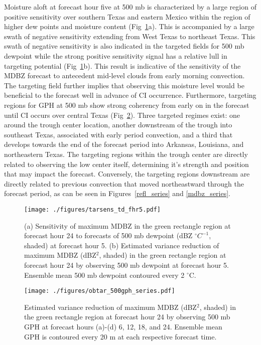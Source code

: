 \documentclass{ttuthes2007}
\newcommand{\tab}{\hspace*{2em}}  %
\begin{document}
\tab Moisture aloft at forecast hour five at 500 mb is characterized by a large region of positive sensitivity over southern Texas and eastern Mexico within the region of higher dew points and moisture content (Fig~\ref{tarsens_td_fhr5}a). This is accompanied by a large swath of negative sensitivity extending from West Texas to northeast Texas. This swath of negative sensitivity is also indicated in the targeted fields for 500 mb dewpoint while the strong positive sensitivity signal has a relative lull in targeting potential (Fig~\ref{tarsens_td_fhr5}b). This result is indicative of the sensitivity of the MDBZ forecast to antecedent mid-level clouds from early morning convection. The targeting field further implies that observing this moisture level would be beneficial to the forecast well in advance of CI occurrence. Furthermore, targeting regions for GPH at 500 mb show strong coherency from early on in the forecast until CI occurs over central Texas (Fig~\ref{obtar_500gph_series}). Three targeted regimes exist: one around the trough center location, another downstream of the trough into southeast Texas, associated with early period convection, and a third that develops towards the end of the forecast period into Arkansas, Louisiana, and northeastern Texas. The targeting regions within the trough center are directly related to observing the low center itself, determining it's strength and position that may impact the forecast.  Conversely, the targeting regions downstream are directly related to previous convection that moved northeastward through the forecast period, as can be seen in Figures~\ref{refl_series} and \ref{mdbz_series}. 

\begin{figure}[!tb]
  \centering
  \noindent\texttt{[image: ./figures/tarsens\_td\_fhr5.pdf]}\\
  \caption{(a) Sensitivity of maximum MDBZ in the green rectangle region at forecast hour 24 to forecasts of 500 mb dewpoint (dBZ ${}^{\circ}C^{-1}$, shaded) at forecast hour 5. (b) Estimated variance reduction of maximum MDBZ (dBZ${}^2$, shaded) in the green rectangle region at forecast hour 24 by observing 500 mb dewpoint at forecast hour 5. Ensemble mean 500 mb dewpoint contoured every 2 ${}^{\circ}$C.}
\label{tarsens_td_fhr5}
\end{figure}

\begin{figure}[!tb]
  \centering
  \noindent\texttt{[image: ./figures/obtar\_500gph\_series.pdf]}\\
  \caption{Estimated variance reduction of maximum MDBZ (dBZ${}^2$, shaded) in the green rectangle region at forecast hour 24 by observing 500 mb GPH at forecast hours (a)-(d) 6, 12, 18, and 24. Ensemble mean GPH is contoured every 20 m at each respective forecast time.}
\label{obtar_500gph_series}
\end{figure}
\end{document}
